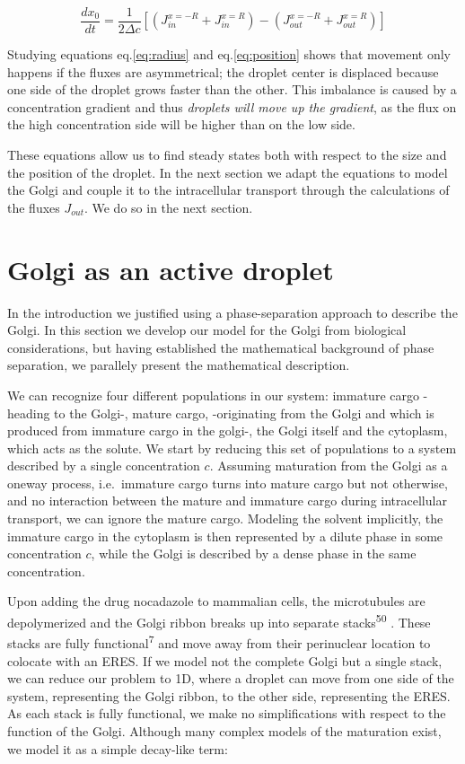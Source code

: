 \documentclass{Dissertate}
\begin{document}
\[
\frac{dx_0}{dt}=\frac{1}{2\Delta c}\left[(J_{in}^{x=-R}+J_{in}^{x=R})-(J_{out}^{x=-R}+J_{out}^{x=R})\right]
\]

Studying equations eq.\ref{eq:radius} and eq.\ref{eq:position} shows
that movement only happens if the fluxes are asymmetrical; the droplet
center is displaced because one side of the droplet grows faster than
the other. This imbalance is caused by a concentration gradient and thus
\emph{droplets will move up the gradient}, as the flux on the high
concentration side will be higher than on the low side.

These equations allow us to find steady states both with respect to the
size and the position of the droplet. In the next section we adapt the
equations to model the Golgi and couple it to the intracellular
transport through the calculations of the fluxes \(J_{out}\). We do so
in the next section.

\hypertarget{golgi-as-an-active-droplet}{%
\section{Golgi as an active droplet}\label{golgi-as-an-active-droplet}}

In the introduction we justified using a phase-separation approach to
describe the Golgi. In this section we develop our model for the Golgi
from biological considerations, but having established the mathematical
background of phase separation, we parallely present the mathematical
description.

We can recognize four different populations in our system: immature
cargo -heading to the Golgi-, mature cargo, -originating from the Golgi
and which is produced from immature cargo in the golgi-, the Golgi
itself and the cytoplasm, which acts as the solute. We start by reducing
this set of populations to a system described by a single concentration
\(c\). Assuming maturation from the Golgi as a oneway process,
i.e.~immature cargo turns into mature cargo but not otherwise, and no
interaction between the mature and immature cargo during intracellular
transport, we can ignore the mature cargo. Modeling the solvent
implicitly, the immature cargo in the cytoplasm is then represented by a
dilute phase in some concentration \(c\), while the Golgi is described
by a dense phase in the same concentration.

Upon adding the drug nocadazole to mammalian cells, the microtubules are
depolymerized and the Golgi ribbon breaks up into separate
stacks\textsuperscript{50} . These stacks are fully
functional\textsuperscript{7} and move away from their perinuclear
location to colocate with an ERES. If we model not the complete Golgi
but a single stack, we can reduce our problem to 1D, where a droplet can
move from one side of the system, representing the Golgi ribbon, to the
other side, representing the ERES. As each stack is fully functional, we
make no simplifications with respect to the function of the Golgi.
Although many complex models of the maturation exist, we model it as a
simple decay-like term:
\end{document}
